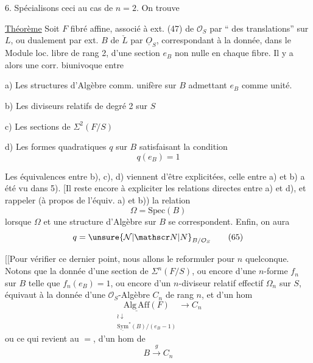 6. Spécialisons ceci au cas de $n=2$. On trouve

\uline{Théorème} Soit $F$ fibré affine, associé à
ext. (47) de $\mathcal O_S$ par `` des translations'' sur $L$,
ou dualement par ext. $B$ de $\check L$ par $\underline O_S$, correspondant
à la donnée, dans le Module loc. libre
 de rang 2,  d'une section $e_B$ non nulle
en chaque fibre. Il y a alors une
corr. biunivoque entre

a) Les structures d'Algèbre comm. unifère
sur $B$ admettant $e_B$ comme  unité.

b) Les diviseurs relatifs  de degré 2 sur $S$

c) Les sections de $\Sigma^2(F/S)$

\margin{\rule{0.35pt}{2.2\baselineskip}}d) Les formes quadratiques $q$ sur $B$ satisfaisant
la condition
\[
 q(e_B)=1 \tag*{(63)}
\]

Les équivalences entre b), c), d) viennent
d'être explicitées, celle entre a) et b) a
été vu dans 5). [Il reste encore à expliciter
les relations directes entre a) et d), et rappeler
(à propos de l'équiv. a) et b)) la relation
\[
\Omega=\mathrm{Spec}(B) \tag*{(64)}
\]
lorsque $\Omega$  et une structure d'Algèbre sur $B$
se correspondent. Enfin, on aura
\[
q=\unsure{\mathcal N|\mathscr N|N}_{B/\mathcal O_S} \tag*{(65)}
\]

[[Pour vérifier ce dernier point, nous allons le
reformuler pour $n$ quelconque. Notons que
la donnée d'une section de $\Sigma^n(F/S)$, ou
encore d'une $n$-forme $f_n$ sur $B$ telle que
$f_n(e_B)=1$, ou encore d'un $n$-diviseur relatif
effectif $\Omega_n$ sur $S$, équivaut à la donnée d'une
$\mathcal O_S$-Algèbre  $C_n$  de rang $n$, et d'un hom 
\[
\underset{\substack{\wr\downarrow\\\underline{\mathrm{Sym}}^*(B)/(e_B-1)}}{\underline{\mathrm{Alg\,Aff}}(F)}\longrightarrow C_n
\]
ou ce qui revient au $=$, d'un hom de 
\[
 B\xrightarrow{g} C_n \tag*{(66)}
\]


